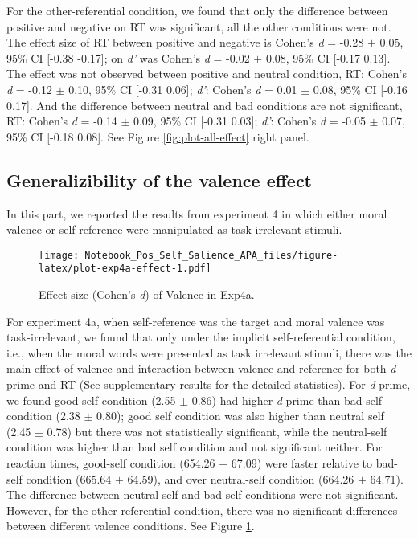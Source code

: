 \documentclass[
  english,
  man]{apa6}
\begin{document}
For the other-referential condition, we found that only the difference between positive and negative on RT was significant, all the other conditions were not. The effect size of RT between positive and negative is Cohen's \emph{d} = -0.28 \(\pm\) 0.05, 95\% CI {[}-0.38 -0.17{]}; on \emph{d'} was Cohen's \emph{d} = -0.02 \(\pm\) 0.08, 95\% CI {[}-0.17 0.13{]}. The effect was not observed between positive and neutral condition, RT: Cohen's \emph{d} = -0.12 \(\pm\) 0.10, 95\% CI {[}-0.31 0.06{]}; \emph{d'}: Cohen's \emph{d} = 0.01 \(\pm\) 0.08, 95\% CI {[}-0.16 0.17{]}. And the difference between neutral and bad conditions are not significant, RT: Cohen's \emph{d} = -0.14 \(\pm\) 0.09, 95\% CI {[}-0.31 0.03{]}; \emph{d'}: Cohen's \emph{d} = -0.05 \(\pm\) 0.07, 95\% CI {[}-0.18 0.08{]}. See Figure \ref{fig:plot-all-effect} right panel.

\hypertarget{generalizibility-of-the-valence-effect}{%
\subsection{Generalizibility of the valence effect}\label{generalizibility-of-the-valence-effect}}

In this part, we reported the results from experiment 4 in which either moral valence or self-reference were manipulated as task-irrelevant stimuli.

\begin{figure}
\centering
\texttt{[image: Notebook\_Pos\_Self\_Salience\_APA\_files/figure-latex/plot-exp4a-effect-1.pdf]}
\caption{\label{fig:plot-exp4a-effect}Effect size (Cohen's \emph{d}) of Valence in Exp4a.}
\end{figure}

For experiment 4a, when self-reference was the target and moral valence was task-irrelevant, we found that only under the implicit self-referential condition, i.e., when the moral words were presented as task irrelevant stimuli, there was the main effect of valence and interaction between valence and reference for both \emph{d} prime and RT (See supplementary results for the detailed statistics). For \emph{d} prime, we found good-self condition (2.55 \(\pm\) 0.86) had higher \emph{d} prime than bad-self condition (2.38 \(\pm\) 0.80); good self condition was also higher than neutral self (2.45 \(\pm\) 0.78) but there was not statistically significant, while the neutral-self condition was higher than bad self condition and not significant neither. For reaction times, good-self condition (654.26 \(\pm\) 67.09) were faster relative to bad-self condition (665.64 \(\pm\) 64.59), and over neutral-self condition (664.26 \(\pm\) 64.71). The difference between neutral-self and bad-self conditions were not significant. However, for the other-referential condition, there was no significant differences between different valence conditions. See Figure \ref{fig:plot-exp4a-effect}.
\end{document}
